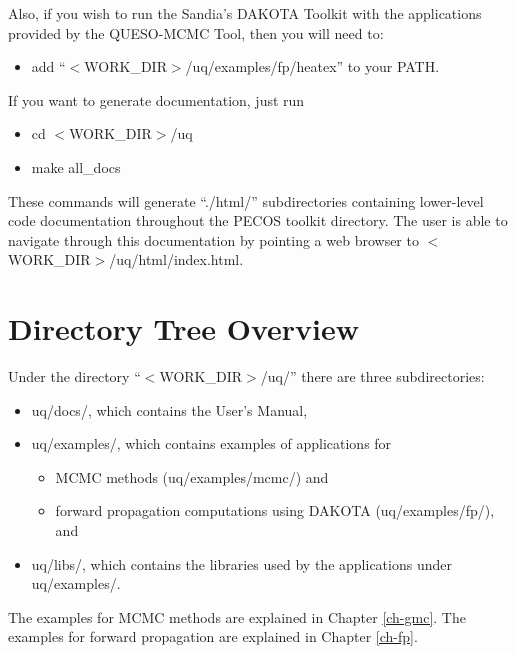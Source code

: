 Also, if you wish to run the Sandia's DAKOTA Toolkit \cite{dakota} with the applications provided by the QUESO-MCMC Tool, then you will need to:
\begin{itemize}
\item add ``$<$WORK\_DIR$>$/uq/examples/fp/heatex'' to your PATH.
\end{itemize}

If you want to generate documentation, just run
\begin{itemize}
\item cd $<$WORK\_DIR$>$/uq
\item make all\_docs
\end{itemize}
These commands will generate ``./html/'' subdirectories containing lower-level code documentation throughout the PECOS toolkit directory.
The user is able to navigate through this documentation by pointing a web browser to $<$WORK\_DIR$>$/uq/html/index.html.

\section{Directory Tree Overview}

Under the directory ``$<$WORK\_DIR$>$/uq/'' there are three subdirectories:
\begin{itemize}
\item uq/docs/, which contains the User's Manual,%
\item {uq/examples/, which contains examples of applications for
\begin{itemize}
\item MCMC methods (uq/examples/mcmc/) and
\item forward propagation computations using DAKOTA (uq/examples/fp/), and
\end{itemize}
}
\item uq/libs/, which contains the libraries used by the applications under uq/examples/.
\end{itemize}

The examples for MCMC methods are explained in Chapter \ref{ch-gmc}.
The examples for forward propagation are explained in Chapter \ref{ch-fp}.
